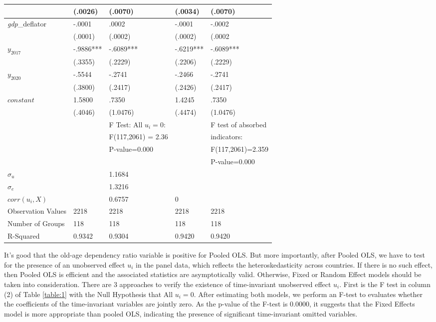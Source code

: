 \documentclass[ %
    final,
    scrbook,
    listoffigures,
    listoftables, 
    glossary]{cu-thesis}
\begin{document}
\begin{center}
\begin{longtable}{|m{2cm}|m{3cm}|m{3cm}|m{2.5cm}|m{3.5cm}|}
  & (.0026) & (.0070) & (.0034) & (.0070)\\ 
    \hline
    \textit{gdp}\_deflator & -.0001 & .0002 & -.0001 & -.0002\\ 
  & (.0001) & (.0002) & (.0002) & (.0002\\
  \hline
    $y_{2017}$ & -.9886*** & -.6089*** & -.6219*** & -.6089***\\ 
  & (.3355) & (.2229) & (.2206) & (.2229)\\
    \hline
    $y_{2020}$ & -.5544 & -.2741 & -.2466 & -.2741\\
  & (.3800) & (.2417) & (.2426) & (.2417)\\
      \hline
    $constant$ & 1.5800 & .7350 & 1.4245 & .7350\\ 
  & (.4046) & (1.0476) & (.4474) & (1.0476)\\
  \hline
     &  & F Test: All $u_i=0$: & & F test of absorbed\\
     &  & F(117,2061) = 2.36  &  &indicators:\\     
     &  & P-value=0.000 &  & F(117,2061)=2.359\\ 
    &  & &  & P-value=0.000\\
\hline
    $\sigma_{u}$ &  & 1.1684 &  & \\
      \hline
      $\sigma_{e} $     &  & 1.3216  &  & \\
      \hline
      $corr(u_{i},X)$ &  & 0.6757 & 0 & \\
      \hline
Observation Values & 2218 & 2218 & 2218 & 2218 \\ 
\hline

Number of Groups & 118 & 118 & 118 & 118\\
\hline
R-Squared & 0.9342 & 0.9304 & 0.9420 & 0.9420\\
\hline
\end{longtable}
\end{center}


It's good that the old-age dependency ratio variable is positive for Pooled OLS. But more importantly, after Pooled OLS, we have to test for the presence of an unobserved effect $u_i$ in the panel data, which reflects the heteroskedasticity across countries. If there is no such effect, then Pooled OLS is efficient and the associated statistics are asymptotically valid. Otherwise, Fixed or Random Effect models should be taken into consideration. There are 3 approaches to verify the existence of time-invariant unobserved effect $u_i$. First is the F test in column (2) of Table \ref{table:1} with the Null Hypothesis that All $u_i=0$. After estimating both models, we perform an F-test to evaluates whether the coefficients of the time-invariant variables are jointly zero. As the p-value of the F-test is 0.0000, it suggests that the Fixed Effects model is more appropriate than pooled OLS, indicating the presence of significant time-invariant omitted variables.
\end{document}
